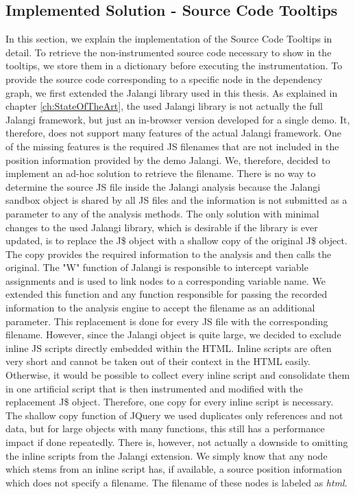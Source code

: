 \subsection{Implemented Solution - Source Code Tooltips}
In this section, we explain the implementation of the Source Code Tooltips in detail. To retrieve the non-instrumented source code necessary to show in the tooltips, we store them in a dictionary before executing the instrumentation. To provide the source code corresponding to a specific node in the dependency graph, we first extended the Jalangi library used in this thesis. As explained in chapter \ref{ch:StateOfTheArt}, the used Jalangi library is not actually the full Jalangi framework, but just an in-browser version developed for a single demo. It, therefore, does not support many features of the actual Jalangi framework. One of the missing features is the required JS filenames that are not included in the position information provided by the demo Jalangi. We, therefore, decided to implement an ad-hoc solution to retrieve the filename. There is no way to determine the source JS file inside the Jalangi analysis because the Jalangi sandbox object is shared by all JS files and the information is not submitted as a parameter to any of the analysis methods. The only solution with minimal changes to the used Jalangi library, which is desirable if the library is ever updated, is to replace the J\$ object with a shallow copy of the original J\$ object. The copy provides the required information to the analysis and then calls the original. The "W" function of Jalangi is responsible to intercept variable assignments and is used to link nodes to a corresponding variable name. We extended this function and any function responsible for passing the recorded information to the analysis engine to accept the filename as an additional parameter. This replacement is done for every JS file with the corresponding filename. However, since the Jalangi object is quite large, we decided to exclude inline JS scripts directly embedded within the HTML. Inline scripts are often very short and cannot be taken out of their context in the HTML easily. Otherwise, it would be possible to collect every inline script and consolidate them in one artificial script that is then instrumented and modified with the replacement J\$ object. Therefore, one copy for every inline script is necessary. The shallow copy function of JQuery we used duplicates only references and not data, but for large objects with many functions, this still has a performance impact if done repeatedly. There is, however, not actually a downside to omitting the inline scripts from the Jalangi extension. We simply know that any node which stems from an inline script has, if available, a source position information which does not specify a filename. The filename of these nodes is labeled as \emph{html}.\\
